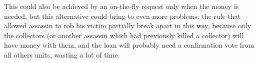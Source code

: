 				This could also be achieved by an on-the-fly request only when the money is needed, but this alternative could bring to even more problems: the rule that allowed assassin to rob his victim partially break apart in this way, because only the collectors (or another assassin which had previously killed a collector) will have money with them, and the loan will probably need a confirmation vote from all others units, wasting a lot of time.
		
